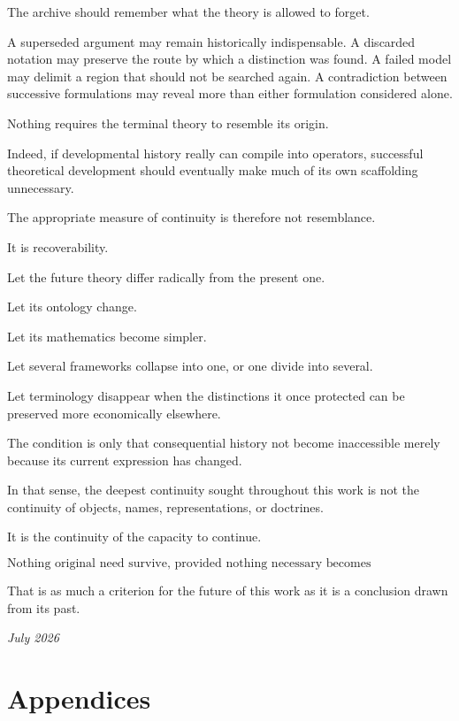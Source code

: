 \documentclass[11pt]{article}
\theoremstyle{remark}
\begin{document}
The archive should remember what the theory is allowed to forget.

A superseded argument may remain historically indispensable.
A discarded notation may preserve the route by which a distinction was found.
A failed model may delimit a region that should not be searched again.
A contradiction between successive formulations may reveal more than either
formulation considered alone.

Nothing requires the terminal theory to resemble its origin.

Indeed, if developmental history really can compile into operators, successful
theoretical development should eventually make much of its own scaffolding
unnecessary.

The appropriate measure of continuity is therefore not resemblance.

It is recoverability.

Let the future theory differ radically from the present one.

Let its ontology change.

Let its mathematics become simpler.

Let several frameworks collapse into one, or one divide into several.

Let terminology disappear when the distinctions it once protected can be
preserved more economically elsewhere.

The condition is only that consequential history not become inaccessible merely
because its current expression has changed.

In that sense, the deepest continuity sought throughout this work is not the
continuity of objects, names, representations, or doctrines.

It is the continuity of the capacity to continue.

\begin{equation}
\boxed{
\text{Nothing original need survive, provided nothing necessary becomes
unrecoverable.}
}
\end{equation}

That is as much a criterion for the future of this work as it is a conclusion
drawn from its past.

\bigskip

\begin{center}
\emph{July 2026}
\end{center}

\newpage
\section*{Appendices}
\end{document}
